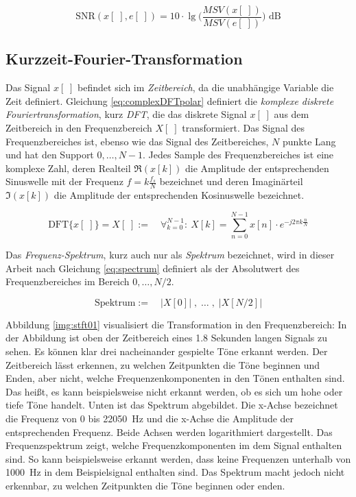 \begin{equation}
\text{SNR}(x[\;],e[\;]) = 10 \cdot  \lg \Big(\frac{MSV(x[\;])}{MSV(e[\;])} \Big) \text{ dB}
\label{eq:snrDb}
\end{equation}

\subsection{Kurzzeit-Fourier-Transformation}
\label{sec:stft}

Das Signal $x[\;]$ befindet sich im \emph{Zeitbereich}, da die unabhängige Variable die Zeit definiert. Gleichung \ref{eq:complexDFTpolar} definiert die \emph{komplexe diskrete Fouriertransformation}, kurz \emph{DFT}, die das diskrete Signal $x[\;]$ aus dem Zeitbereich in den Frequenzbereich $X[\;]$ transformiert. Das Signal des Frequenzbereiches ist, ebenso wie das Signal des Zeitbereiches, $N$ punkte Lang und hat den Support $0 , \ldots , N-1$. Jedes Sample des Frequenzbereiches ist eine komplexe Zahl, deren Realteil $\Re(x[k])$ die Amplitude der entsprechenden Sinuswelle mit der Frequenz $f = k\frac{f_s}{N}$ bezeichnet und deren Imaginärteil  $\Im(x[k])$ die Amplitude der entsprechenden Kosinuswelle bezeichnet.\cite[S. 149, S. 567 - 571]{dspGuide} \cite[S. 60]{sprachverarbeitung}

\begin{equation}
\label{eq:complexDFTpolar}
\text{DFT}\{x[\;]\} = X[\;]  := \quad \mathop{\forall}_{k = 0}^{N-1} :\ X[k] =  \sum_{n = 0}^{N-1}  x[n] \cdot e^{-j 2\pi k \frac{n}{N}}
\end{equation}

Das \emph{Frequenz-Spektrum}, kurz auch nur als \emph{Spektrum} bezeichnet, wird in dieser Arbeit nach Gleichung \ref{eq:spectrum} definiert als der Absolutwert des Frequenzbereiches im Bereich $0, \ldots , N/2$.

\begin{equation}
\label{eq:spectrum}
\text{Spektrum} := \quad |X[0]| \; , \; \ldots \; , \; |X[N/2]|
\end{equation}

Abbildung \ref{img:stft01} visualisiert die Transformation in den Frequenzbereich: In der Abbildung ist oben der Zeitbereich eines 1.8 Sekunden langen Signals zu sehen. Es können klar drei nacheinander gespielte Töne erkannt werden. Der Zeitbereich lässt erkennen, zu welchen Zeitpunkten die Töne beginnen und Enden, aber nicht, welche Frequenzenkomponenten in den Tönen enthalten sind. Das heißt, es kann beispielsweise nicht erkannt werden, ob es sich um hohe oder tiefe Töne handelt. Unten ist das Spektrum abgebildet. Die x-Achse bezeichnet die Frequenz von 0 bis \SI{22050}{\hertz} und die x-Achse die Amplitude der entsprechenden Frequenz. Beide Achsen werden logarithmiert dargestellt. Das Frequenzspektrum zeigt, welche Frequenzkomponenten im dem Signal enthalten sind. So kann beispielsweise erkannt werden, dass keine Frequenzen unterhalb von \SI{1000}{\hertz} in dem Beispielsignal enthalten sind. Das Spektrum macht jedoch nicht erkennbar, zu welchen Zeitpunkten die Töne beginnen oder enden. 

